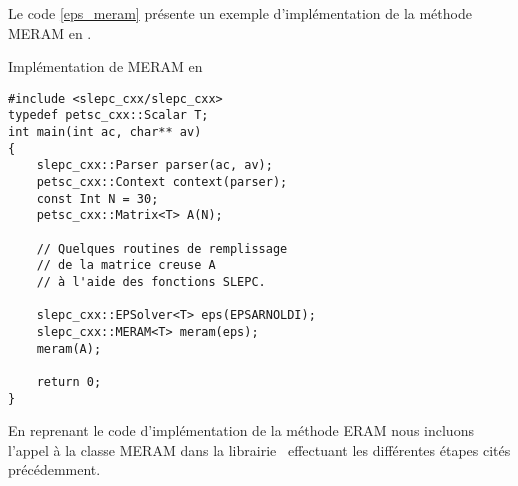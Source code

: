 Le code \ref{eps_meram} présente un exemple d'implémentation de la méthode MERAM en \slepcx.

\begin{algorithm}[h]
  \caption{Implémentation de MERAM en \slepcx}
  \label{eps_meram}
\begin{verbatim}
#include <slepc_cxx/slepc_cxx>
typedef petsc_cxx::Scalar T;
int main(int ac, char** av)
{
    slepc_cxx::Parser parser(ac, av);
    petsc_cxx::Context context(parser);
    const Int N = 30;
    petsc_cxx::Matrix<T> A(N);

    // Quelques routines de remplissage
    // de la matrice creuse A
    // à l'aide des fonctions SLEPC.

    slepc_cxx::EPSolver<T> eps(EPSARNOLDI);
    slepc_cxx::MERAM<T> meram(eps);
    meram(A);

    return 0;
}
\end{verbatim}
\end{algorithm}

En reprenant le code d'implémentation de la méthode ERAM nous incluons l'appel à la classe MERAM dans la librairie \slepcx\ effectuant les différentes étapes cités précédemment.
